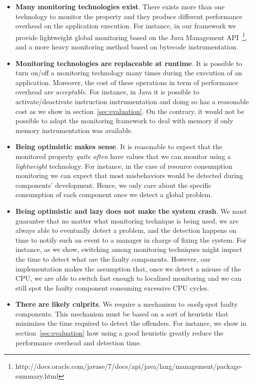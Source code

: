 \begin{itemize}
\item \textbf{Many monitoring technologies exist}. There exists more than one technology to monitor the property and they produce different performance overhead on the application execution.
For instance, in our framework we provide lightweight global monitoring based on the Java Management API~\footnote{http://docs.oracle.com/javase/7/docs/api/java/lang/management/package-summary.html}, and 
a more heavy monitoring method based on bytecode instrumentation.

\item \textbf{Monitoring technologies are replaceable at runtime}. It is possible to turn on/off a monitoring technology many times during the execution of an application.
Moreover, the cost of these operations in term of performance overhead are \textit{acceptable}.
For instance, in Java it is possible to activate/deactivate instruction instrumentation and doing so has a reasonable cost as we show in section~\ref{sec:evaluation}.
On the contrary, it would not be possible to adapt the monitoring framework to deal with memory if only memory instrumentation was available.

\item \textbf{Being optimistic makes sense}. It is reasonable to expect that the monitored property \textit{quite often} have values that we can monitor using a \textit{lightweight} technology.
For instance, in the case of resource consumption monitoring we can expect that most misbehaviors would be detected during components' development.
Hence, we only care about the specific consumption of each component once we detect a global problem.

\item \textbf{Being optimistic and lazy does not make the system crash}. We must guarantee that no matter what monitoring technique is being used, we are always able to eventually detect a problem, and the detection happens on time to notify such an event to a manager in charge of fixing the system.
For instance, as we show, switching among monitoring techniques might impact the time to detect what are the faulty components.
However, our implementation makes the assumption that, once we detect a misuse of the CPU, we are able to switch fast enough to localized monitoring and we can still spot the faulty component consuming excessive CPU cycles. 

\item \textbf{There are likely culprits}. We require a mechanism to \textit{easily} spot faulty components.
This mechanism must be based on a sort of heuristic that minimizes the time required to detect the offenders.
For instance, we show in section~\ref{sec:evaluation} how using a good heuristic greatly reduce the performance overhead and detection time.
\end{itemize}

